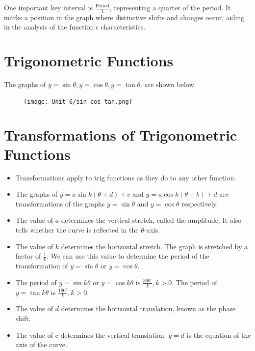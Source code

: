 \documentclass{article}
\begin{document}
One important key interval is $\frac{\text{Period}}{4}$, representing a quarter of the period. It marks a position in the graph where distinctive shifts and changes occur, aiding in the analysis of the function's characteristics.

\section{Trigonometric Functions}
The graphs of $y=\sin\theta, y=\cos\theta, y=\tan\theta.$ are shown below.
\begin{figure}[h]
    \centering
    \texttt{[image: Unit 6/sin-cos-tan.png]}
\end{figure}
\section{Transformations of Trigonometric Functions}
\begin{itemize}
    \item Transformations apply to trig functions as they do to any other function.
    \item The graphs of $y=a \sin k(\theta+d)+c$ and $y=a \cos k(\theta+b)+d$ are transformations of the graphs $y=\sin \theta$ and $y=\cos \theta$ respectively.
    \item The value of $a$ determines the vertical stretch, called the amplitude. It also tells whether the curve is reflected in the $\theta$-axis.
    \item The value of $k$ determines the horizontal stretch. The graph is stretched by a factor of $\frac{1}{k}$. We can use this value to determine the period of the transformation of $y=\sin \theta$ or $y=\cos \theta$.
    \item The period of $y=\sin k \theta$ or $y=\cos k \theta$ is $\frac{360^{\circ}}{k}, k>0$. The period of $y=\tan k \theta$ is $\frac{180^{\circ}}{k}, k>0$.
    \item The value of $d$ determines the horizontal translation, known as the phase shift.
    \item The value of $\mathrm{c}$ determines the vertical translation. $y=d$ is the equation of the axis of the curve.
\end{itemize}
\end{document}
